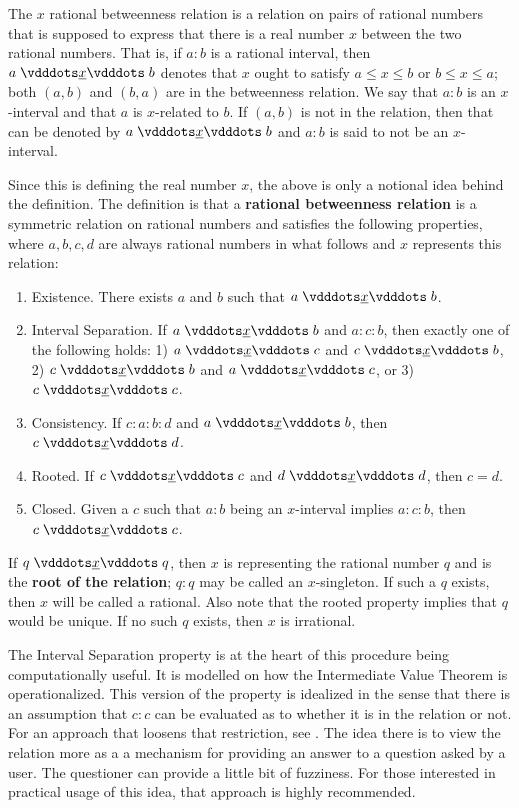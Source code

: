 \documentclass[12pt]{article}
\begin{document}
The $x$ rational betweenness relation is a relation on pairs of rational numbers that is supposed to express that there is a real number $x$ between the two rational numbers. That is, if $a : b$ is a rational interval, then $a \xrel b$ denotes that $x$ ought to satisfy $a \leq x \leq b$ or $b \leq x \leq a$;  both $(a,b)$ and $(b,a)$ are in the betweenness relation. We say that $a:b$ is an $x$-interval and that $a$ is $x$-related to $b$. If $(a,b)$ is not in the relation, then that can be denoted by \sout{$a \xrel b$} and $a:b$ is said to not be an $x$-interval. 

Since this is defining the real number $x$, the above is only a notional idea behind the definition. The definition is that a \textbf{rational betweenness relation} is a symmetric relation on rational numbers and satisfies the following properties, where $a,b,c,d$ are always rational numbers in what follows and $x$ represents this relation:
\begin{enumerate}
    \item Existence. There exists $a$ and $b$ such that $a\xrel b$.
    \item Interval Separation. If $a \xrel b$ and $a : c : b$, then exactly one of the following holds: 1) $a \xrel c$ and \sout{$c \xrel b$}, 2) $c \xrel b$ and \sout{$a \xrel c$}, or 3) $c \xrel c$. 
    \item Consistency. If $c : a : b : d$ and $a \xrel b$, then $c \xrel d$. 
    \item Rooted. If $c \xrel c$ and $d \xrel d$, then $c=d$. 
    \item Closed. Given a $c$ such that $a:b$ being an $x$-interval implies $a:c:b$, then $c \xrel c$. 
\end{enumerate}

If $q \xrel q$, then $x$ is representing the rational number $q$ and is the \textbf{root of the relation}; $q:q$ may be called an $x$-singleton. If such a $q$ exists, then $x$ will be called a rational. Also note that the rooted property implies that $q$ would be unique. If no such $q$ exists, then $x$ is irrational. 

The Interval Separation property is at the heart of this procedure being computationally useful. It is modelled on how the Intermediate Value Theorem is operationalized. This version of the property is idealized in the sense that there is an assumption that $c:c$ can be evaluated as to whether it is in the relation or not. For an approach that loosens that restriction, see \cite{taylor23main}. The idea there is to view the relation more as a a mechanism for providing an answer to a question asked by a user. The questioner can provide a little bit of fuzziness. For those interested in practical usage of this idea, that approach is highly recommended. 
\end{document}
